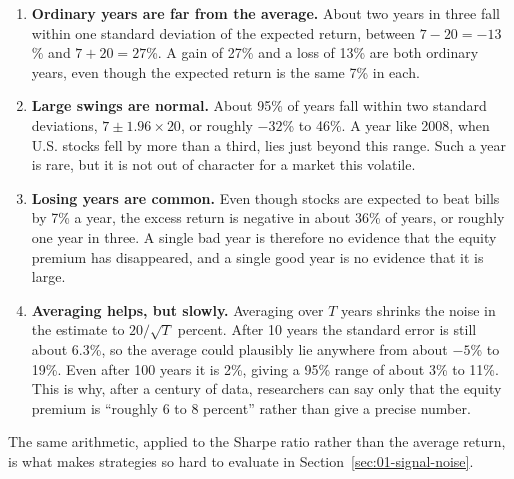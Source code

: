 \begin{enumerate}
  \item \textbf{Ordinary years are far from the average.} About two years in three fall within one standard deviation of the expected return, between $7 - 20 = -13$\% and $7 + 20 = 27$\%. A gain of 27\% and a loss of 13\% are both ordinary years, even though the expected return is the same 7\% in each.
  \item \textbf{Large swings are normal.} About 95\% of years fall within two standard deviations, $7 \pm 1.96 \times 20$, or roughly $-32$\% to 46\%. A year like 2008, when U.S. stocks fell by more than a third, lies just beyond this range. Such a year is rare, but it is not out of character for a market this volatile.
  \item \textbf{Losing years are common.} Even though stocks are expected to beat bills by 7\% a year, 
  the excess return is negative in about 36\% of years, or roughly one year in three. A single bad year is therefore no evidence that the equity premium has disappeared, and a single good year is no evidence that it is large.
  \item \textbf{Averaging helps, but slowly.} Averaging over $T$ years shrinks the noise in the estimate to $20/\sqrt{T}$ percent. After 10 years the standard error is still about 6.3\%, so the average could plausibly lie anywhere from about $-5$\% to 19\%. Even after 100 years it is 2\%, giving a 95\% range of about 3\% to 11\%. This is why, after a century of data, researchers can say only that the equity premium is ``roughly 6 to 8 percent'' rather than give a precise number.
\end{enumerate}

The same arithmetic, applied to the Sharpe ratio rather than the average return, is what makes strategies so hard to evaluate in Section~\ref{sec:01-signal-noise}.


